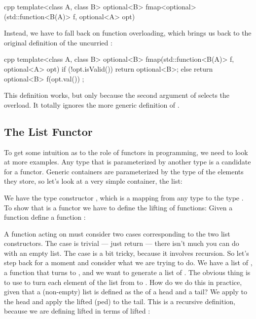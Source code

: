 \begin{snip}{cpp}
template<class A, class B>
optional<B> fmap<optional>(std::function<B(A)> f, optional<A> opt)
\end{snip}
Instead, we have to fall back on function overloading, which brings us
back to the original definition of the uncurried :

\begin{snip}{cpp}
template<class A, class B>
optional<B> fmap(std::function<B(A)> f, optional<A> opt) { 
    if (!opt.isValid()) 
        return optional<B>{}; 
    else
        return optional<B>{ f(opt.val()) };
}
\end{snip}
This definition works, but only because the second argument of
 selects the overload. It totally ignores the more generic
definition of .

\subsection{The List Functor}

To get some intuition as to the role of functors in programming, we need
to look at more examples. Any type that is parameterized by another type
is a candidate for a functor. Generic containers are parameterized by
the type of the elements they store, so let's look at a very simple
container, the list:

We have the type constructor , which is a mapping from any
type  to the type . To show that 
is a functor we have to define the lifting of functions: Given a
function  define a function
:

A function acting on  must consider two cases
corresponding to the two list constructors. The  case is
trivial --- just return  --- there isn't much you can do
with an empty list. The  case is a bit tricky, because it
involves recursion. So let's step back for a moment and consider what we
are trying to do. We have a list of , a function 
that turns  to , and we want to generate a list of
. The obvious thing is to use  to turn each element
of the list from  to . How do we do this in
practice, given that a (non-empty) list is defined as the 
of a head and a tail? We apply  to the head and apply the
lifted (ped)  to the tail. This is a recursive
definition, because we are defining lifted  in terms of lifted
:

